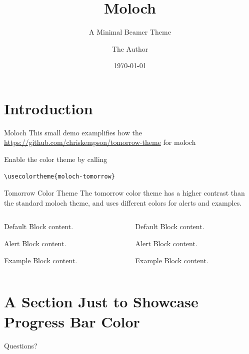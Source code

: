 \documentclass[10pt]{beamer}
\title{Moloch}
\subtitle{A Minimal Beamer Theme}
\date{\today}
\author{The Author}
\institute{Some Institution, Some University}
\begin{document}
\maketitle

\section{Introduction}

\begin{frame}[fragile]{Moloch}
  This small demo examplifies how the \href{tomorrow color theme}{https://github.com/chriskempson/tomorrow-theme}
  for moloch

  Enable the color theme by calling
  \begin{verbatim}
\usecolortheme{moloch-tomorrow}\end{verbatim}
\end{frame}

\begin{frame}[fragile]{Tomorrow Color Theme}
  The tomorrow color theme has a higher contrast than the standard moloch theme, and uses
  different colors for alerts and examples.

  \begin{columns}[T]
    \begin{column}{0.45\textwidth}
      \begin{block}{Default}
        Block content.
      \end{block}

      \begin{alertblock}{Alert}
        Block content.
      \end{alertblock}

      \begin{exampleblock}{Example}
        Block content.
      \end{exampleblock}
    \end{column}
    \begin{column}{0.45\textwidth}
      {

        \begin{block}{Default}
          Block content.
        \end{block}

        \begin{alertblock}{Alert}
          Block content.
        \end{alertblock}

        \begin{exampleblock}{Example}
          Block content.
        \end{exampleblock}
      }
    \end{column}
  \end{columns}
\end{frame}

\section{A Section Just to Showcase Progress Bar Color}

\begin{frame}[standout]
  Questions?
\end{frame}
\end{document}
